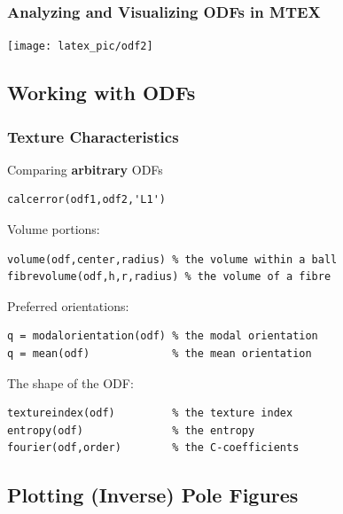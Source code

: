\documentclass{beamer}
\newcommand{\MTEX}{{\bf {\color{red}M}TEX\,}}%
\begin{document}
\begin{frame}
  \frametitle{Analyzing and Visualizing ODFs in \MTEX}

  \begin{center}
    \texttt{[image: latex\_pic/odf2]}
  \end{center}
\end{frame}

\subsection*{Working with ODFs}

\begin{frame}[fragile]
  \frametitle{Texture Characteristics}

Comparing {\bf arbitrary} ODFs
\begin{lstlisting}
calcerror(odf1,odf2,'L1')
\end{lstlisting}

\pause

Volume portions: 
\begin{lstlisting}
volume(odf,center,radius) % the volume within a ball
fibrevolume(odf,h,r,radius) % the volume of a fibre
\end{lstlisting}

\pause

Preferred orientations:
\begin{lstlisting}
q = modalorientation(odf) % the modal orientation
q = mean(odf)             % the mean orientation 
\end{lstlisting}

\pause

The shape of the ODF:
\begin{lstlisting}
textureindex(odf)         % the texture index
entropy(odf)              % the entropy
fourier(odf,order)        % the C-coefficients     
\end{lstlisting}


\end{frame}


\subsection*{Plotting (Inverse) Pole Figures}
\end{document}
